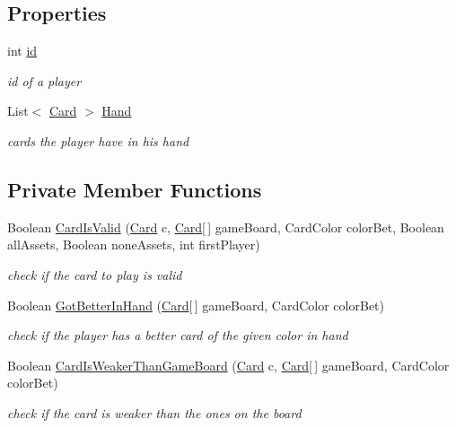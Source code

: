 \subsection*{Properties}
\begin{DoxyCompactItemize}
\item 
int \hyperlink{class_coinche_1_1_player_af200e29b3845a8610f019f93e9b49caa}{id}
\begin{DoxyCompactList}\small\item\em id of a player \end{DoxyCompactList}\item 
List$<$ \hyperlink{class_coinche_1_1_card}{Card} $>$ \hyperlink{class_coinche_1_1_player_a22527d95a53a30c571986e354ebc63f8}{Hand}
\begin{DoxyCompactList}\small\item\em cards the player have in his hand \end{DoxyCompactList}\end{DoxyCompactItemize}
\subsection*{Private Member Functions}
\begin{DoxyCompactItemize}
\item 
Boolean \hyperlink{class_coinche_1_1_player_adfb688665d8b3e6493e4832d32fbaf1d}{Card\+Is\+Valid} (\hyperlink{class_coinche_1_1_card}{Card} c, \hyperlink{class_coinche_1_1_card}{Card}\mbox{[}$\,$\mbox{]} game\+Board, Card\+Color color\+Bet, Boolean all\+Assets, Boolean none\+Assets, int first\+Player)
\begin{DoxyCompactList}\small\item\em check if the card to play is valid \end{DoxyCompactList}\item 
Boolean \hyperlink{class_coinche_1_1_player_a8f04f1fb2e697163b2728450c3e24f31}{Got\+Better\+In\+Hand} (\hyperlink{class_coinche_1_1_card}{Card}\mbox{[}$\,$\mbox{]} game\+Board, Card\+Color color\+Bet)
\begin{DoxyCompactList}\small\item\em check if the player has a better card of the given color in hand \end{DoxyCompactList}\item 
Boolean \hyperlink{class_coinche_1_1_player_a93948ebdc512c349d00390d44272bc14}{Card\+Is\+Weaker\+Than\+Game\+Board} (\hyperlink{class_coinche_1_1_card}{Card} c, \hyperlink{class_coinche_1_1_card}{Card}\mbox{[}$\,$\mbox{]} game\+Board, Card\+Color color\+Bet)
\begin{DoxyCompactList}\small\item\em check if the card is weaker than the ones on the board \end{DoxyCompactList}\end{DoxyCompactItemize}


